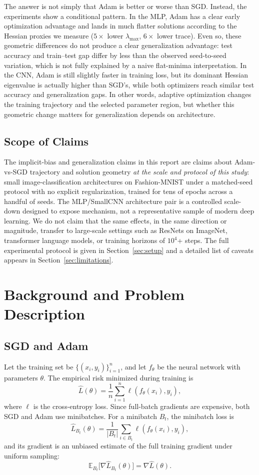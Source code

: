 \documentclass[11pt]{article}
\begin{document}
The answer is not simply that Adam is better or worse than SGD. Instead, the experiments show a conditional pattern. In the MLP, Adam has a clear early optimization advantage and lands in much flatter solutions according to the Hessian proxies we measure ($5\times$ lower $\lambda_{\max}$, $6\times$ lower trace). Even so, these geometric differences do not produce a clear generalization advantage: test accuracy and train--test gap differ by less than the observed seed-to-seed variation, which is not fully explained by a naive flat-minima interpretation. In the CNN, Adam is still slightly faster in training loss, but its dominant Hessian eigenvalue is actually higher than SGD's, while both optimizers reach similar test accuracy and generalization gaps. In other words, adaptive optimization changes the training trajectory and the selected parameter region, but whether this geometric change matters for generalization depends on architecture.

\subsection{Scope of Claims}

The implicit-bias and generalization claims in this report are claims about Adam-vs-SGD trajectory and solution geometry \emph{at the scale and protocol of this study}: small image-classification architectures on Fashion-MNIST under a matched-seed protocol with no explicit regularization, trained for tens of epochs across a handful of seeds. The MLP/SmallCNN architecture pair is a controlled scale-down designed to expose mechanism, not a representative sample of modern deep learning. We do not claim that the same effects, in the same direction or magnitude, transfer to large-scale settings such as ResNets on ImageNet, transformer language models, or training horizons of $10^4$+ steps. The full experimental protocol is given in Section~\ref{sec:setup} and a detailed list of caveats appears in Section~\ref{sec:limitations}.

\section{Background and Problem Description}

\subsection{SGD and Adam}

Let the training set be $\{(x_i,y_i)\}_{i=1}^n$, and let $f_\theta$ be the neural network with parameters $\theta$. The empirical risk minimized during training is
\[
\widehat L(\theta)
= \frac{1}{n}\sum_{i=1}^n \ell(f_\theta(x_i),y_i),
\]
where $\ell$ is the cross-entropy loss. Since full-batch gradients are expensive, both SGD and Adam use minibatches. For a minibatch $B_t$, the minibatch loss is
\[
\widehat L_{B_t}(\theta)
= \frac{1}{|B_t|}\sum_{i\in B_t}\ell(f_\theta(x_i),y_i),
\]
and its gradient is an unbiased estimate of the full training gradient under uniform sampling:
\[
\mathbb{E}_{B_t}\big[\nabla \widehat L_{B_t}(\theta)\big]
= \nabla \widehat L(\theta).
\]
\end{document}
